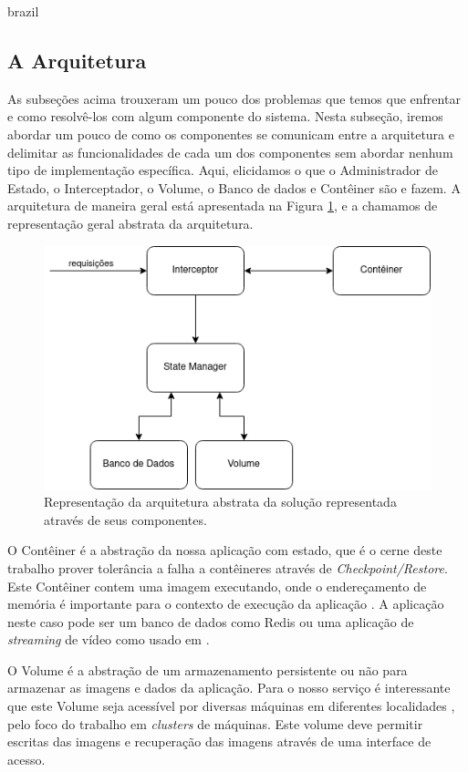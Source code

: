 \begin{otherlanguage*}{brazil}
\subsection{A Arquitetura}

As subseções acima trouxeram um pouco dos problemas que temos que enfrentar e como
resolvê-los com algum componente do sistema. Nesta subseção, iremos
abordar um pouco de como os componentes se comunicam entre a arquitetura e delimitar as
funcionalidades de cada um dos componentes sem abordar nenhum tipo de implementação
específica. Aqui, elicidamos o que o Administrador de Estado, o Interceptador, o Volume, o
Banco de dados e Contêiner são e fazem. A arquitetura de maneira geral está apresentada na Figura
\ref{fig:abstract-architecture}, e a chamamos de representação geral abstrata da arquitetura.

\begin{figure}[h]
\centering
\includegraphics[scale=0.8]{images/abstract-architecture.png}
\caption{Representação da arquitetura abstrata da solução representada através de seus componentes.}
\label{fig:abstract-architecture}
\end{figure}

O Contêiner é a abstração da nossa aplicação com estado, que é o cerne deste trabalho
prover tolerância a falha a contêineres através de \textit{Checkpoint/Restore}. Este Contêiner
contem uma imagem executando, onde o endereçamento de memória é importante para o contexto
de execução da aplicação \cite{Chen2015/10}. A aplicação neste caso pode ser um banco
de dados como Redis ou uma aplicação de \textit{streaming} de vídeo como usado em \cite{vayghan2021kubernetes}.

O Volume é a abstração de um armazenamento persistente ou não para armazenar as imagens e
dados da aplicação. Para o nosso serviço é interessante que este Volume seja acessível
por diversas máquinas em diferentes localidades \cite{vayghan2021kubernetes}, pelo foco
do trabalho em \textit{clusters} de máquinas. Este volume deve permitir escritas das imagens
e recuperação das imagens através de uma interface de acesso.


\end{otherlanguage*}
